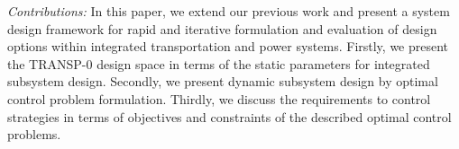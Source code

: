 





\textit{Contributions:} In this paper, we extend our previous work \cite{Hackenberg2012, ascher2014early, ascher2015integrated} and present a system design framework for rapid and iterative formulation and evaluation of design options within integrated transportation and power systems. Firstly, we present the TRANSP-0 design space in terms of the static parameters for integrated subsystem design. Secondly, we present dynamic subsystem design by optimal control problem formulation. Thirdly, we discuss the requirements to control strategies in terms of objectives and constraints of the described optimal control problems.


